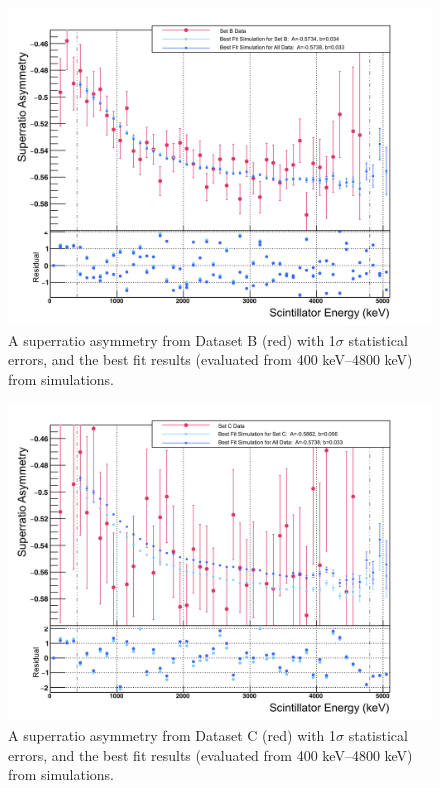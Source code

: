%
\begin{figure}[h!t!b!]
	\centering
	\includegraphics[width=.999\linewidth]
	{Figures/BestAsymmetry_SetB.png}
	\caption[SetB Superratio Asymmetry]{A superratio asymmetry from Dataset B (red) with 1$\sigma$ statistical errors, and the best fit results (evaluated from 400 keV--4800 keV) from simulations.  %
	}	
	\label{fig:asymmetryB}
\end{figure}
%
\begin{figure}[h!t!b!]
	\centering
	\includegraphics[width=.999\linewidth]
	{Figures/BestAsymmetry_SetC.png}
	\caption[SetC Superratio Asymmetry]{A superratio asymmetry from Dataset C (red) with 1$\sigma$ statistical errors, and the best fit results (evaluated from 400 keV--4800 keV) from simulations.  %
	}	
	\label{fig:asymmetryC}
\end{figure}
